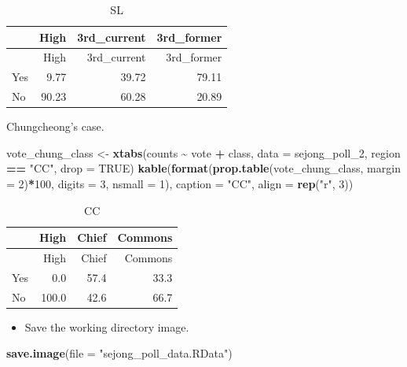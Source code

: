 \documentclass[
]{article}
\newenvironment{Shaded}{\begin{snugshade}}{\end{snugshade}}
\newcommand{\DataTypeTok}[1]{\textcolor[rgb]{0.13,0.29,0.53}{#1}}
\newcommand{\DecValTok}[1]{\textcolor[rgb]{0.00,0.00,0.81}{#1}}
\newcommand{\KeywordTok}[1]{\textcolor[rgb]{0.13,0.29,0.53}{\textbf{#1}}}
\newcommand{\NormalTok}[1]{#1}
\newcommand{\OperatorTok}[1]{\textcolor[rgb]{0.81,0.36,0.00}{\textbf{#1}}}
\newcommand{\OtherTok}[1]{\textcolor[rgb]{0.56,0.35,0.01}{#1}}
\newcommand{\StringTok}[1]{\textcolor[rgb]{0.31,0.60,0.02}{#1}}
\providecommand{\tightlist}{%
  \setlength{\itemsep}{0pt}\setlength{\parskip}{0pt}}
\begin{document}
\begin{longtable}[]{@{}lrrr@{}}
\caption{SL}\tabularnewline
\toprule
& High & 3rd\_current & 3rd\_former\tabularnewline
\midrule
\endfirsthead
\toprule
& High & 3rd\_current & 3rd\_former\tabularnewline
\midrule
\endhead
Yes & 9.77 & 39.72 & 79.11\tabularnewline
No & 90.23 & 60.28 & 20.89\tabularnewline
\bottomrule
\end{longtable}

Chungcheong's case.

\begin{Shaded}
\begin{Highlighting}[]
\NormalTok{vote\_chung\_class \textless{}{-}}\StringTok{ }\KeywordTok{xtabs}\NormalTok{(counts }\OperatorTok{\textasciitilde{}}\StringTok{ }\NormalTok{vote }\OperatorTok{+}\StringTok{ }\NormalTok{class, }\DataTypeTok{data =}\NormalTok{ sejong\_poll\_}\DecValTok{2}\NormalTok{, region }\OperatorTok{==}\StringTok{ "CC"}\NormalTok{, }\DataTypeTok{drop =} \OtherTok{TRUE}\NormalTok{)}
\KeywordTok{kable}\NormalTok{(}\KeywordTok{format}\NormalTok{(}\KeywordTok{prop.table}\NormalTok{(vote\_chung\_class, }\DataTypeTok{margin =} \DecValTok{2}\NormalTok{)}\OperatorTok{*}\DecValTok{100}\NormalTok{, }\DataTypeTok{digits =} \DecValTok{3}\NormalTok{, }\DataTypeTok{nsmall =} \DecValTok{1}\NormalTok{), }\DataTypeTok{caption =} \StringTok{"CC"}\NormalTok{, }\DataTypeTok{align =} \KeywordTok{rep}\NormalTok{(}\StringTok{"r"}\NormalTok{, }\DecValTok{3}\NormalTok{))}
\end{Highlighting}
\end{Shaded}

\begin{longtable}[]{@{}lrrr@{}}
\caption{CC}\tabularnewline
\toprule
& High & Chief & Commons\tabularnewline
\midrule
\endfirsthead
\toprule
& High & Chief & Commons\tabularnewline
\midrule
\endhead
Yes & 0.0 & 57.4 & 33.3\tabularnewline
No & 100.0 & 42.6 & 66.7\tabularnewline
\bottomrule
\end{longtable}

\begin{itemize}
\tightlist
\item
  Save the working directory image.
\end{itemize}

\begin{Shaded}
\begin{Highlighting}[]
\KeywordTok{save.image}\NormalTok{(}\DataTypeTok{file =} \StringTok{"sejong\_poll\_data.RData"}\NormalTok{)}
\end{Highlighting}
\end{Shaded}
\end{document}

